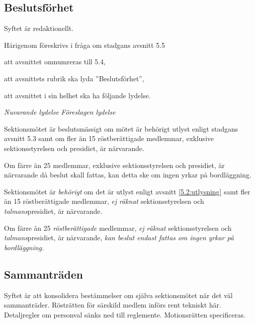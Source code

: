 \documentclass{article}
\newenvironment{lydelse}
    {\begin{paracol}{2}%
        \emph{Nuvarande lydelse}%
        \switchcolumn%
        \emph{Föreslagen lydelse}%
    \end{paracol}%
    \begin{enumerate}[label=\thesubsection.\arabic*]%
    \begin{paracol}{2}%
    }{\end{paracol}\end{enumerate}}
\begin{document}
\subsection{Beslutsförhet}
Syftet är redaktionellt.

Härigenom föreskrivs i fråga om stadgans avsnitt 5.5
\begin{dels}
  \item att avsnittet omnumreras till 5.4,
  \item att avsnittets rubrik ska lyda ''Beslutsförhet'',
  \item att avsnittet i sin helhet ska ha följande lydelse.
\end{dels}

\begin{lydelse}
  \setcounter{subsection}{5}
  \item Sektionsmötet är beslutsmässigt om mötet är behörigt utlyst enligt stadgans avsnitt 5.3 samt om fler än 15 röstberättigade medlemmar, exklusive sektionsstyrelsen och presidiet, är närvarande.
  \item Om färre än 25 medlemmar, exklusive sektionsstyrelsen och presidiet, är närvarande då beslut skall fattas, kan detta ske om ingen yrkar på bordläggning.

\switchcolumn
  \setcounter{subsection}{4}
  \item Sektionsmötet är \emph{behörigt} om det är utlyst enligt avsnitt \ref{5.2:utlysning} samt fler än 15 röstberättigade medlemmar, \emph{ej räknat} sektionsstyrelsen och \emph{talmans}presidiet, är närvarande.
  \item Om färre än 25 \emph{röstberättigade} medlemmar, \emph{ej räknat} sektionsstyrelsen och \emph{talmans}presidiet, är närvarande, \emph{kan beslut endast fattas om ingen yrkar på bordläggning.}
\end{lydelse}

\setcounter{subsection}{4}
\subsection{Sammanträden}
Syftet är att konsolidera bestämmelser om själva sektionsmötet när det väl sammanträder.
Rösträtten för särskild medlem införs rent tekniskt här.
Detaljregler om personval sänks ned till reglemente.
Motionsrätten specificeras.
\end{document}
